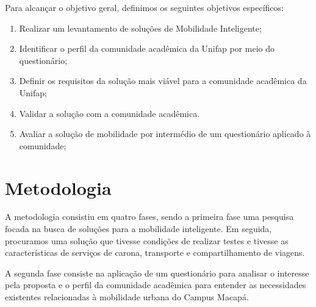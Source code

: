 Para alcançar o objetivo geral, definimos os seguintes objetivos específicos:

\begin{enumerate}

\item Realizar um levantamento de soluções de Mobilidade Inteligente;

\item Identificar o perfil da comunidade acadêmica da Unifap por meio do questionário; %

\item Definir os requisitos da solução mais viável para a comunidade acadêmica da Unifap;

\item Validar a solução com a comunidade acadêmica.

\item Avaliar a solução de mobilidade por intermédio de um questionário aplicado à comunidade;

\end{enumerate}

\section{Metodologia}
A metodologia consistiu em quatro fases, sendo a primeira fase uma pesquisa focada na busca de soluções para a mobilidade inteligente. Em seguida, procuramos uma solução que tivesse condições de realizar testes e tivesse as características de serviços de carona, transporte e compartilhamento de viagens.

A segunda fase consiste na aplicação de um questionário para analisar o interesse pela proposta e o perfil da comunidade acadêmica para entender as necessidades existentes relacionadas à mobilidade urbana do Campus Macapá.

